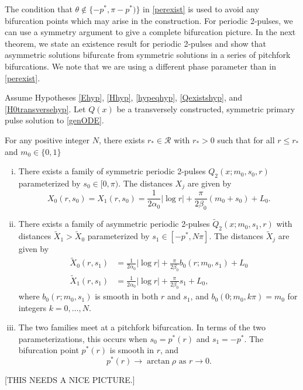\documentclass[thesis.tex]{subfiles}
\begin{document}
The condition that $\theta \notin \{-p^*, \pi - p^*) \}$ in \cref{perexist} is used to avoid any bifurcation points which may arise in the construction. For periodic 2-pulses, we can use a symmetry argument to give a complete bifurcation picture. In the next theorem, we state an existence result for periodic 2-pulses and show that asymmetric solutions bifurcate from symmetric solutions in a series of pitchfork bifurcations. We note that we are using a different phase parameter than in \cref{perexist}.

\begin{theorem}\label{2pulsebifurcation}
Assume Hypotheses \ref{Ehyp}, \ref{Hhyp}, \ref{hypeqhyp}, \ref{Qexistshyp}, and \ref{H0transversehyp}. Let $Q(x)$ be a transversely constructed, symmetric primary pulse solution to \eqref{genODE}.

For any positive integer $N$, there exists $r_* \in \mathcal{R}$ with $r_* > 0$ such that for all $r \leq r_*$ and $m_0 \in \{0, 1\}$
\begin{enumerate}[(i)]
	\item There exists a family of symmetric periodic 2-pulses $Q_2(x; m_0, s_0, r)$ parameterized by $s_0 \in [0, \pi)$. The distances $X_j$ are given by
	\begin{equation*}
		X_0(r, s_0) = X_1(r, s_0) = \frac{1}{2 \alpha_0} |\log r| + \frac{\pi}{2\beta_0} (m_0 + s_0) + L_0.
	\end{equation*}
	\item There exists a family of asymmetric periodic 2-pulses $\tilde{Q}_2(x; m_0, s_1, r)$ with distances $\tilde{X}_1 > \tilde{X}_0$ parameterized by $s_1 \in [-p^*, N \pi]$. The distances $\tilde{X}_j$ are given by
	\begin{equation*}
	\begin{aligned}
		\tilde{X}_0(r, s_1) &= \frac{1}{2 \alpha_0} |\log r| + \frac{\pi}{2\beta_0} b_0(r; m_0, s_1) + L_0 \\
		\tilde{X}_1(r, s_1) &= \frac{1}{2 \alpha_0} |\log r| + \frac{\pi}{2\beta_0} s_1 + L_0, 
	\end{aligned}
	\end{equation*}
	where $b_0(r; m_0, s_1)$ is smooth in both $r$ and $s_1$, and $b_0(0; m_0, k \pi) = m_0$ for integers $k = 0, \dots, N$.

	\item The two families meet at a pitchfork bifurcation. In terms of the two parameterizations, this occurs when $s_0 = p^*(r)$ and $s_1 = -p^*$. The bifurcation point $p^*(r)$ is smooth in $r$, and
	\[
	p^*(r)\rightarrow \arctan \rho \text{ as }r \rightarrow 0.
	\]
\end{enumerate}
\end{theorem}
[THIS NEEDS A NICE PICTURE.]
\end{document}
